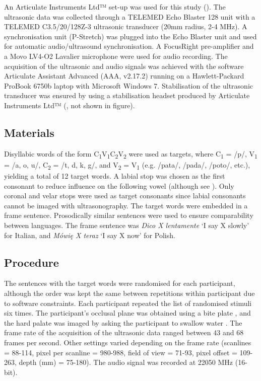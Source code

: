 \documentclass[authoryear, twocolumn]{elsarticle}
\begin{document}
An Articulate Instruments Ltd™ set-up was used for this study
(). The ultrasonic data was collected through a
TELEMED Echo Blaster 128 unit with a TELEMED C3.5/20/128Z-3 ultrasonic
transducer (20mm radius, 2-4 MHz). A synchronisation unit (P-Stretch)
was plugged into the Echo Blaster unit and used for automatic
audio/ultrasound synchronisation. A FocusRight pre-amplifier and a Movo
LV4-O2 Lavalier microphone were used for audio recording. The
acquisition of the ultrasonic and audio signals was achieved with the
software Articulate Assistant Advanced (AAA, v2.17.2) running on a
Hawlett-Packard ProBook 6750b laptop with Microsoft Windows 7.
Stabilisation of the ultrasonic transducer was ensured by using a
stabilisation headset produced by Articulate Instruments Ltd™
(\citealt{articulate2008}, not shown in figure).

\subsection{Materials}\label{materials}

Disyllabic words of the form
C\textsubscript{1}V\textsubscript{1}C\textsubscript{2}V\textsubscript{2}
were used as targets, where C\textsubscript{1} = /p/, V\textsubscript{1}
= /a, o, u/, C\textsubscript{2} = /t, d, k, g/, and V\textsubscript{2} =
V\textsubscript{1} (e.g. /pata/, /pada/, /poto/, etc.), yielding a total
of 12 target words. A labial stop was chosen as the first consonant to
reduce influence on the following vowel (although see
\citealt{vazquez-alvarez2007}). Only coronal and velar stops were used
as target consonants since labial consonants cannot be imaged with
ultrasonography. The target words were embedded in a frame sentence.
Prosodically similar sentences were used to ensure comparability between
languages. The frame sentence was \emph{Dico X lentamente} `I say X
slowly' for Italian, and \emph{Mówię X teraz} `I say X now' for Polish.

\subsection{Procedure}\label{procedure}

The sentences with the target words were randomised for each
participant, although the order was kept the same between repetitions
within participant due to software constraints. Each participant
repeated the list of randomised stimuli six times. The participant's
occlusal plane was obtained using a bite plate \citep{scobbie2011}, and
the hard palate was imaged by asking the participant to swallow water
\citep{epstein2005}. The frame rate of the acquisition of the ultrasonic
data ranged between 43 and 68 frames per second. Other settings varied
depending on the frame rate (scanlines = 88-114, pixel per scanline =
980-988, field of view = 71-93, pixel offset = 109-263, depth (mm) =
75-180). The audio signal was recorded at 22050 MHz (16-bit).
\end{document}
